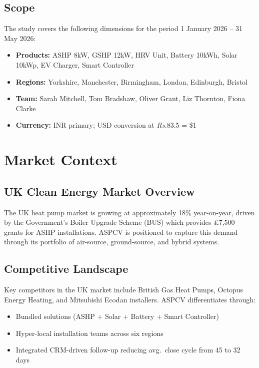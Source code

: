 \documentclass[12pt,a4paper]{report}
\newcommand{\rupee}{\textit{\textsf{\small Rs.}}}
\begin{document}
\section{Scope}

The study covers the following dimensions for the period 1 January 2026 -- 31 May 2026:
\begin{itemize}[noitemsep]
  \item \textbf{Products:} ASHP 8kW, GSHP 12kW, HRV Unit, Battery 10kWh, Solar 10kWp, EV Charger, Smart Controller
  \item \textbf{Regions:} Yorkshire, Manchester, Birmingham, London, Edinburgh, Bristol
  \item \textbf{Team:} Sarah Mitchell, Tom Bradshaw, Oliver Grant, Liz Thornton, Fiona Clarke
  \item \textbf{Currency:} INR primary; USD conversion at \rupee{}83.5 = \$1
\end{itemize}

\chapter{Market Context}

\section{UK Clean Energy Market Overview}

The UK heat pump market is growing at approximately 18\% year-on-year, driven by the Government's Boiler Upgrade Scheme (BUS) which provides \pounds7,500 grants for ASHP installations. ASPCV is positioned to capture this demand through its portfolio of air-source, ground-source, and hybrid systems.

\section{Competitive Landscape}

Key competitors in the UK market include British Gas Heat Pumps, Octopus Energy Heating, and Mitsubishi Ecodan installers. ASPCV differentiates through:
\begin{itemize}[noitemsep]
  \item Bundled solutions (ASHP + Solar + Battery + Smart Controller)
  \item Hyper-local installation teams across six regions
  \item Integrated CRM-driven follow-up reducing avg.\ close cycle from 45 to 32 days
\end{itemize}
\end{document}
